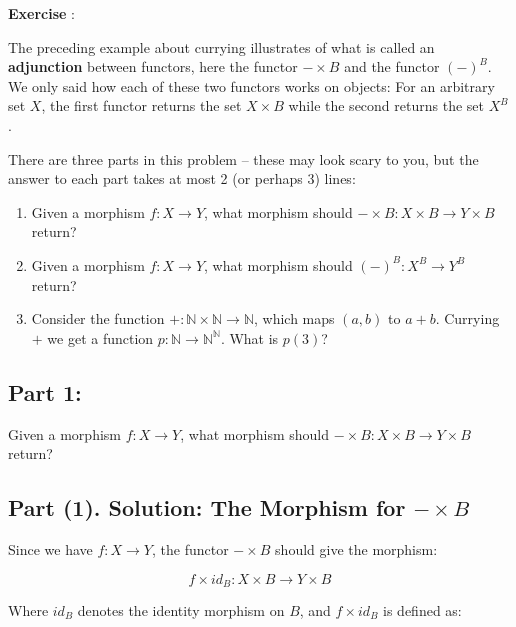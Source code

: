 \documentclass{article}
\begin{document}
\begin{mdframed}
    \textbf{Exercise }:
    
    \vspace{1em}
The preceding example about currying illustrates of what is called an \textbf{adjunction} between functors, here the functor $- \times B$ and the functor $(-)^B$. We only said how each of these two functors works on objects: For an arbitrary set $X$, the first functor returns the set $X \times B$ while the second returns the set $X^B$.

There are three parts in this problem -- these may look scary to you, but the answer to each part takes at most 2 (or perhaps 3) lines:

\begin{enumerate}
    \item Given a morphism $f : X \to Y$, what morphism should $- \times B : X \times B \to Y \times B$ return?
    
    \vspace{1em}
    \item Given a morphism $f : X \to Y$, what morphism should $(-)^B : X^B \to Y^B$ return?
    
    \vspace{1em}
    \item Consider the function $+ : \mathbb{N} \times \mathbb{N} \to \mathbb{N}$, which maps $(a,b)$ to $a + b$. 
    Currying $+$ we get a function $p : \mathbb{N} \to \mathbb{N}^{\mathbb{N}}$. What is $p(3)$?
\end{enumerate}
\end{mdframed}
    

 \subsection*{Part 1:  } 
 Given a morphism $f : X \to Y$, what morphism should $- \times B : X \times B \to Y \times B$ return? 

 \subsection*{Part (1). Solution: The Morphism for $- \times B$}

 
Since we have $f: X \to Y$, the functor $- \times B$ should give the morphism:
 
 \[ f \times id_B : X \times B \to Y \times B \]
 
 Where $id_B$ denotes the identity morphism on $B$, and $f \times id_B$ is defined as:
 
\end{document}
